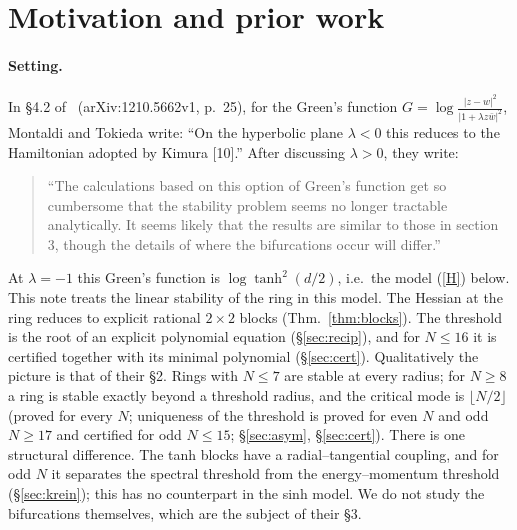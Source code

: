 \documentclass[11pt]{article}
\theoremstyle{remark}
\begin{document}
\section{Motivation and prior work}\label{sec:motivation}
\paragraph{Setting.} In \S4.2 of~\cite{MT} (arXiv:1210.5662v1, p.~25), for the
Green's function $G=\log\frac{|z-w|^2}{|1+\lambda z\bar w|^2}$, Montaldi and Tokieda write: ``On the hyperbolic plane
$\lambda<0$ this reduces to the Hamiltonian adopted by Kimura [10].'' After discussing $\lambda>0$, they write:
\begin{quote}
``The calculations based on this option of Green's function get so cumbersome that the stability problem seems no
longer tractable analytically. It seems likely that the results are similar to those in section 3, though the details
of where the bifurcations occur will differ.''
\end{quote}
At $\lambda=-1$ this Green's function is $\log\tanh^2(d/2)$, i.e.\ the model (\ref{H}) below. This note treats the
linear stability of the ring in this model. The Hessian at the ring reduces to explicit rational $2\times2$ blocks
(Thm.~\ref{thm:blocks}). The threshold is the root of an explicit polynomial equation (\S\ref{sec:recip}), and for
$N\le16$ it is certified together with its minimal polynomial (\S\ref{sec:cert}). Qualitatively the picture is that of
their \S2. Rings with $N\le7$ are stable at every radius; for
$N\ge8$ a ring is stable exactly beyond a threshold radius, and the critical mode is $\lfloor N/2\rfloor$ (proved for
every $N$; uniqueness of the threshold is proved for even $N$ and odd $N\ge17$ and certified for odd $N\le15$;
\S\ref{sec:asym}, \S\ref{sec:cert}). There is
one structural difference. The tanh blocks have a radial--tangential coupling, and for odd $N$ it separates the spectral
threshold from the energy--momentum threshold (\S\ref{sec:krein}); this has no counterpart in the sinh model. We do not
study the bifurcations themselves, which are the subject of their \S3.
\end{document}
